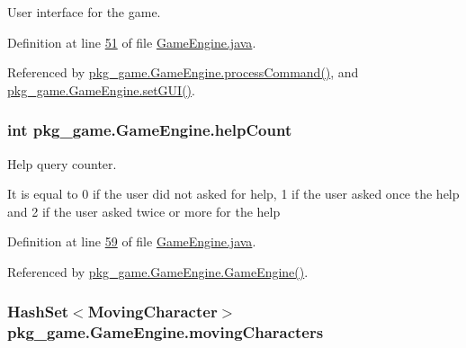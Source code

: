 User interface for the game. 



Definition at line \hyperlink{GameEngine_8java_source_l00051}{51} of file \hyperlink{GameEngine_8java_source}{Game\-Engine.\-java}.



Referenced by \hyperlink{GameEngine_8java_source_l00226}{pkg\-\_\-game.\-Game\-Engine.\-process\-Command()}, and \hyperlink{GameEngine_8java_source_l00083}{pkg\-\_\-game.\-Game\-Engine.\-set\-G\-U\-I()}.

\hypertarget{classpkg__game_1_1GameEngine_a3229e823376625b5d9102d24d628a0fb}{
\subsubsection[{help\-Count}]{\setlength{\rightskip}{0pt plus 5cm}int pkg\-\_\-game.\-Game\-Engine.\-help\-Count\hspace{0.3cm}{\ttfamily [private]}}}\label{classpkg__game_1_1GameEngine_a3229e823376625b5d9102d24d628a0fb}


Help query counter. 

It is equal to 0 if the user did not asked for help, 1 if the user asked once the help and 2 if the user asked twice or more for the help 

Definition at line \hyperlink{GameEngine_8java_source_l00059}{59} of file \hyperlink{GameEngine_8java_source}{Game\-Engine.\-java}.



Referenced by \hyperlink{GameEngine_8java_source_l00070}{pkg\-\_\-game.\-Game\-Engine.\-Game\-Engine()}.

\hypertarget{classpkg__game_1_1GameEngine_a64a7051b0ae6fb816d566be8ddbab3cb}{
\subsubsection[{moving\-Characters}]{\setlength{\rightskip}{0pt plus 5cm}Hash\-Set$<${\bf Moving\-Character}$>$ pkg\-\_\-game.\-Game\-Engine.\-moving\-Characters\hspace{0.3cm}{\ttfamily [private]}}}\label{classpkg__game_1_1GameEngine_a64a7051b0ae6fb816d566be8ddbab3cb}


